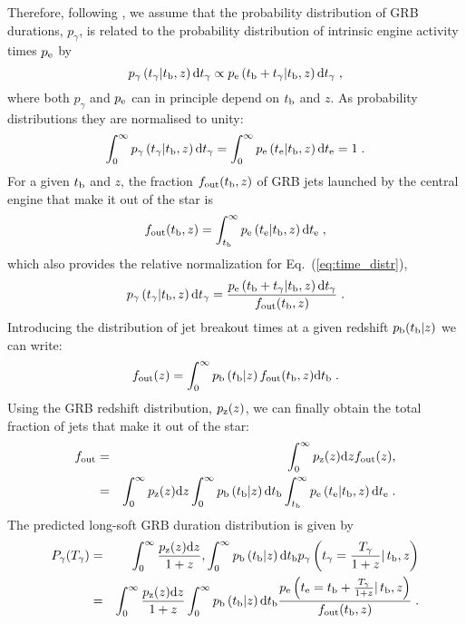 \documentclass[useAMS,usenatbib]{mn2e}
\begin{document}
Therefore, following \cite{Bromberg2012}, we assume that the probability distribution of GRB durations, $p_\gamma$, is related to the probability distribution of intrinsic engine activity times $p_{\rm e}$ by 
\begin{equation}
\label{eq:time_distr}
p_\gamma\left(t_\gamma|t_{\rm b},z\right)\text{d}t_\gamma \propto p_{\rm e}\left(t_{\rm b}+t_\gamma|t_{\rm b},z\right)\text{d}t_\gamma\;,
\end{equation}
where both $p_\gamma$ and $p_{\rm e}$ can in principle depend on $t_{\rm b}$ and $z$.
As probability distributions they are normalised to unity:
\begin{equation}
\label{eq:norm}
\int_{0}^\infty p_\gamma\left(t_\gamma|t_{\rm b},z\right)\text{d}t_\gamma = \int_{0}^\infty p_{\rm e}\left(t_{\rm e}|t_{\rm b},z\right)\text{d}t_{\rm e} = 1\;.
\end{equation}
For a given $t_{\rm b}$ and $z$, the fraction $f_{\rm out}(t_{\rm b},z)$ of GRB jets launched by the central engine that make 
it out of the star is
\begin{equation}
\label{eq:fout1}
f_{\rm out}(t_{\rm b},z)=\int_{t_{\rm b}}^\infty p_{\rm e}\left(t_{\rm e}|t_{\rm b},z\right)\text{d}t_{\rm e}\;,
\end{equation}
which also provides the relative normalization for Eq.~(\ref{eq:time_distr}),
\begin{equation}
\label{eq:time_distr2}
p_\gamma\left(t_\gamma|t_{\rm b},z\right)\text{d}t_\gamma =
\frac{p_{\rm e}\left(t_{\rm b}+t_\gamma|t_{\rm b},z\right)\text{d}t_\gamma}{f_{\rm out}(t_{\rm b},z)}\;.
\end{equation}
Introducing the distribution of jet breakout times at a given redshift $p_{\rm b}(t_{\rm b}|z)$ we can write:
\begin{equation}
\label{eq:fout2}
f_{\rm out}(z)=\int_{0}^\infty p_{\rm b}\left(t_{\rm b}|z\right)f_{\rm out}(t_{\rm b},z)\text{d}t_{\rm b}\;.
\end{equation}
Using the GRB redshift distribution, $p_{\rm z}(z)$, we can finally obtain the total fraction of jets that make it out of the star:
\begin{eqnarray}
\label{eq:fout3}
f_{\rm out}&=&\int_{0}^\infty p_{\rm z}(z)\text{d}z f_{\rm out}(z),
\\ \nonumber
&=& \int_{0}^\infty p_{\rm z}(z)\text{d}z\int_{0}^\infty p_{\rm b}\left(t_{\rm b}|z\right)\text{d}t_{\rm b}\int_{t_{\rm b}}^\infty p_{\rm e}\left(t_{\rm e}|t_{\rm b},z\right)\text{d}t_{\rm e}\;.
\end{eqnarray}
The predicted long-soft GRB duration distribution is given by
\begin{eqnarray}
\label{eq:GRB1}
P_\gamma(T_\gamma) &=&  \int_{0}^\infty \frac{p_{\rm z}(z)\text{d}z}{1+z},
\int_{0}^\infty p_{\rm b}\left(t_{\rm b}|z\right)\text{d}t_{\rm b}p_\gamma\left(t_\gamma=\frac{T_\gamma}{1+z}|\, t_{\rm b},z\right)
\\ \nonumber
&=& \int_{0}^\infty \frac{p_{\rm z}(z)\text{d}z}{1+z}\int_{0}^\infty p_{\rm b}\left(t_{\rm b}|z\right)\text{d}t_{\rm b} 
\frac{p_{\rm e}\left(t_{\rm e}=t_{\rm b}+\frac{T_\gamma}{1+z}|\,t_{\rm b},z\right)}{f_{\rm out}(t_{\rm b},z)}\;.
\end{eqnarray}
\end{document}
